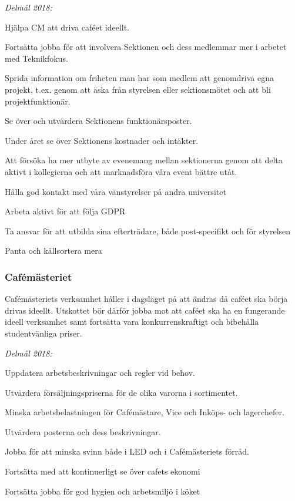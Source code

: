 \documentclass[../_main/handlingar.tex]{subfiles}
\begin{document}
\emph{Delmål 2018:}
\begin{dashlist}
    \item Hjälpa CM att driva caféet ideellt. 
    \item Fortsätta jobba för att involvera Sektionen och dess medlemmar mer i arbetet med Teknikfokus. 
    \item Sprida information om friheten man har som medlem att genomdriva egna projekt, t.ex. genom att äska från styrelsen eller sektionsmötet och att bli projektfunktionär. 
    \item Se över och utvärdera Sektionens funktionärsposter. 
    \item Under året se över Sektionens kostnader och intäkter. 
    \item Att försöka ha mer utbyte av evenemang mellan sektionerna genom att delta aktivt i kollegierna och att marknadsföra våra event bättre utåt. 
    \item Hålla god kontakt med våra vänstyrelser på andra universitet
    \item Arbeta aktivt för att följa GDPR
    \item Ta ansvar för att utbilda sina efterträdare, både post-specifikt och för styrelsen
    \item Panta och källsortera mera \scalebox{0.5}{\recycle}
\end{dashlist}

\subsubsection*{Cafémästeriet}
Cafémästeriets verksamhet håller i dagsläget på att ändras då caféet ska börja drivas ideellt. Utskottet bör därför jobba mot att caféet ska ha en fungerande ideell verksamhet samt fortsätta vara konkurrenskraftigt och bibehålla studentvänliga priser. 

\emph{Delmål 2018:}
\begin{dashlist}
    \item Uppdatera arbetsbeskrivningar och regler vid behov. 
    \item Utvärdera försäljningspriserna för de olika varorna i sortimentet. 
    \item Minska arbetsbelastningen för Cafémästare, Vice och Inköps- och lagerchefer. 
    \item Utvärdera posterna och dess beskrivningar. 
    \item Jobba för att minska svinn både i LED och i Cafémästeriets förråd.
    \item Fortsätta med att kontinuerligt se över cafets ekonomi
    \item Fortsätta jobba för god hygien och arbetsmiljö i köket
\end{dashlist}
\end{document}
